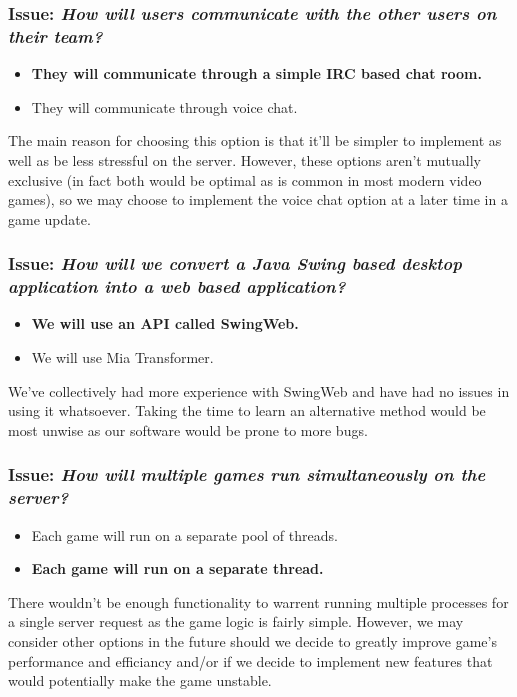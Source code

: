 \subsubsection*{Issue: \textit{How will users communicate with the other users on their team?}}

  \begin{itemize}
    \item \textbf{They will communicate through a simple IRC based chat room.}
    \item They will communicate through voice chat.
  \end{itemize}

The main reason for choosing this option is that it'll be simpler to implement as well as be less stressful on the server. However, these options aren't mutually exclusive (in fact both would be optimal as is common in most modern video games), so we may choose to implement the voice chat option at a later time in a game update.

\subsubsection*{Issue: \textit{How will we convert a Java Swing based desktop application into a web based application?}}

  \begin{itemize}
    \item \textbf{We will use an API called SwingWeb.}
    \item We will use Mia Transformer.
  \end{itemize}

We've collectively had more experience with SwingWeb and have had no issues in using it whatsoever. Taking the time to learn an alternative method would be most unwise as our software would be prone to more bugs.

\subsubsection*{Issue: \textit{How will multiple games run simultaneously on the server?}}

  \begin{itemize}
    \item Each game will run on a separate pool of threads.
    \item \textbf{Each game will run on a separate thread.}
  \end{itemize}

There wouldn't be enough functionality to warrent running multiple processes for a single server request as the game logic is fairly simple. However, we may consider other options in the future should we decide to greatly improve game's performance and efficiancy and/or if we decide to implement new features that would potentially make the game unstable.


